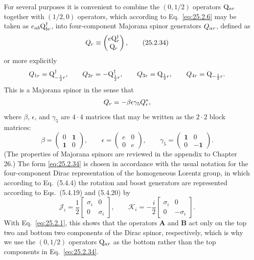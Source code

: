For several purposes it is convenient to combine the \((0,1/2)\) operators
\(\mathrm{Q}_{ar}\) together with \((1/2,0)\) operators, which according to
Eq.~\eqref{eq:25.2.6} may be taken as
\(e_{ab}\mathrm{Q}_{br}^\dagger\), into
four-component Majorana spinor generators \(Q_{\alpha r}\),
defined as
\begin{equation}
Q_r\equiv
\begin{pmatrix}
e\mathrm{Q}_r^\dagger\\
\mathrm{Q}_r
\end{pmatrix},
\tag{25.2.34}\label{eq:25.2.34}
\end{equation}
or more explicitly
\[
Q_{1r}=\mathrm{Q}_{-\frac12 r}^\dagger,
\qquad
Q_{2r}=-\mathrm{Q}_{\frac12 r}^\dagger,
\qquad
Q_{3r}=\mathrm{Q}_{\frac12 r},
\qquad
Q_{4r}=\mathrm{Q}_{-\frac12 r}.
\]
This is a Majorana spinor in the sense that
\[
Q_r=-\beta\epsilon\gamma_5Q_r^*,
\]
where \(\beta\), \(\epsilon\), and \(\gamma_5\) are \(4\cdot4\) matrices
that may be written as the \(2\cdot2\) block matrices:
\[
\beta=
\begin{pmatrix}
0&\mathbf{1}\\
\mathbf{1}&0
\end{pmatrix},
\qquad
\epsilon=
\begin{pmatrix}
e&0\\
0&e
\end{pmatrix},
\qquad
\gamma_5=
\begin{pmatrix}
\mathbf{1}&0\\
0&-\mathbf{1}
\end{pmatrix}.
\]
(The properties of Majorana spinors are reviewed in the appendix to
Chapter 26.) The form \eqref{eq:25.2.34} is chosen in accordance with the
usual notation for the four-component Dirac representation of the
homogeneous Lorentz group, in which according to Eq.~(5.4.4) the rotation
and boost generators are represented according to Eqs.~(5.4.19) and
(5.4.20) by
\begin{equation}
\mathcal J_i
=\frac12
\begin{bmatrix}
\sigma_i&0\\
0&\sigma_i
\end{bmatrix},
\qquad
\mathcal K_i
=-\frac i2
\begin{bmatrix}
\sigma_i&0\\
0&-\sigma_i
\end{bmatrix}.
\tag{25.2.35}\label{eq:25.2.35}
\end{equation}
With Eq.~\eqref{eq:25.2.1}, this shows that the operators \(\mathbf A\)
and \(\mathbf B\) act only on the top two and bottom two components of
the Dirac spinor, respectively, which is why we use the \((0,1/2)\)
operators \(\mathrm{Q}_{ar}\) as the bottom rather than the top components in
Eq.~\eqref{eq:25.2.34}.

